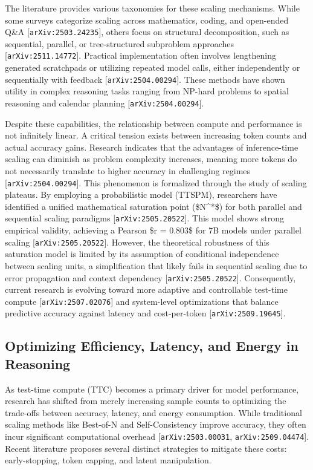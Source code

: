 \documentclass[11pt]{article}
\begin{document}
The literature provides various taxonomies for these scaling mechanisms. While some surveys categorize scaling across mathematics, coding, and open-ended Q\&A [\texttt{arXiv:2503.24235}], others focus on structural decomposition, such as sequential, parallel, or tree-structured subproblem approaches [\texttt{arXiv:2511.14772}]. Practical implementation often involves lengthening generated scratchpads or utilizing repeated model calls, either independently or sequentially with feedback [\texttt{arXiv:2504.00294}]. These methods have shown utility in complex reasoning tasks ranging from NP-hard problems to spatial reasoning and calendar planning [\texttt{arXiv:2504.00294}].

Despite these capabilities, the relationship between compute and performance is not infinitely linear. A critical tension exists between increasing token counts and actual accuracy gains. Research indicates that the advantages of inference-time scaling can diminish as problem complexity increases, meaning more tokens do not necessarily translate to higher accuracy in challenging regimes [\texttt{arXiv:2504.00294}]. This phenomenon is formalized through the study of scaling plateaus. By employing a probabilistic model (TTSPM), researchers have identified a unified mathematical saturation point (\$N\textasciicircum{}*\$) for both parallel and sequential scaling paradigms [\texttt{arXiv:2505.20522}]. This model shows strong empirical validity, achieving a Pearson \$r = 0.803\$ for 7B models under parallel scaling [\texttt{arXiv:2505.20522}]. However, the theoretical robustness of this saturation model is limited by its assumption of conditional independence between scaling units, a simplification that likely fails in sequential scaling due to error propagation and context dependency [\texttt{arXiv:2505.20522}]. Consequently, current research is evolving toward more adaptive and controllable test-time compute [\texttt{arXiv:2507.02076}] and system-level optimizations that balance predictive accuracy against latency and cost-per-token [\texttt{arXiv:2509.19645}].

\subsection{Optimizing Efficiency, Latency, and Energy in Reasoning}

As test-time compute (TTC) becomes a primary driver for model performance, research has shifted from merely increasing sample counts to optimizing the trade-offs between accuracy, latency, and energy consumption. While traditional scaling methods like Best-of-N and Self-Consistency improve accuracy, they often incur significant computational overhead [\texttt{arXiv:2503.00031}, \texttt{arXiv:2509.04474}]. Recent literature proposes several distinct strategies to mitigate these costs: early-stopping, token capping, and latent manipulation.
\end{document}
